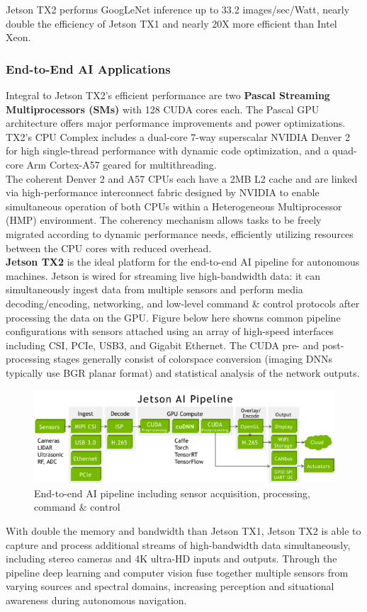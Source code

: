             Jetson TX2 performs GoogLeNet inference up to 33.2 images/sec/Watt, nearly double the efficiency of Jetson TX1 and nearly 20X more efficient than Intel Xeon.
        \subsubsection{End-to-End AI Applications}
            Integral to Jetson TX2’s efficient performance are two \textbf{Pascal Streaming Multiprocessors (SMs)} with 128 CUDA cores each. The Pascal GPU architecture offers major performance improvements and power optimizations. TX2’s CPU Complex includes a dual-core 7-way superscalar 
            NVIDIA Denver 2 for high single-thread performance with dynamic code optimization, and a quad-core Arm Cortex-A57 geared for multithreading. \\ 
            \vspace{3mm}
            The coherent Denver 2 and A57 CPUs each have a 2MB L2 cache and are linked via high-performance interconnect fabric designed by NVIDIA to enable simultaneous operation of both CPUs within a Heterogeneous Multiprocessor (HMP) environment. The coherency mechanism allows tasks 
            to be freely migrated according to dynamic performance needs, efficiently utilizing resources between the CPU cores with reduced overhead. \\ 
            \vspace{3mm}
            \textbf{Jetson TX2} is the ideal platform for the end-to-end AI pipeline for autonomous machines. Jetson is wired for streaming live high-bandwidth data: it can simultaneously ingest data from multiple sensors and perform media decoding/encoding, networking, and low-level command \& control 
            protocols after processing the data on the GPU. Figure below here showns common pipeline configurations with sensors attached using an array of high-speed interfaces including CSI, PCIe, USB3, and Gigabit Ethernet. The CUDA pre- and post-processing stages generally consist of 
            colorspace conversion (imaging DNNs typically use BGR planar format) and statistical analysis of the network outputs.
            \begin{figure}[H]
                \centering
                \includegraphics[width=0.6\linewidth]{img/AI-pipeline.png}
                \caption{End-to-end AI pipeline including sensor acquisition, processing, command \& control}
            \end{figure}
            With double the memory and bandwidth than Jetson TX1, Jetson TX2 is able to capture and process additional streams of high-bandwidth data simultaneously, including stereo cameras and 4K ultra-HD inputs and outputs. Through the pipeline deep learning and computer vision fuse together 
            multiple sensors from varying sources and spectral domains, increasing perception and situational awareness during autonomous navigation.
